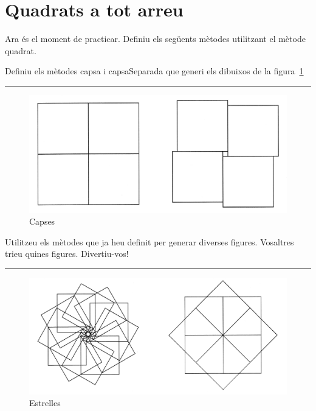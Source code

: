 \section{Quadrats a tot arreu}
Ara és el moment de practicar. Definiu els següents mètodes utilitzant el mètode \textsf{quadrat}.

\begin{center}
\colorbox{black}{}
\end{center}
{\small
\noindent
Definiu els mètodes \textsf{capsa} i \textsf{capsaSeparada} que generi els dibuixos de la figura~\ref{fig1301}}\\
\noindent
\rule{\textwidth}{3pt}

\begin{figure}[h!]
\begin{center}
\includegraphics[scale=0.1]{Imatges/figura13-1.jpg}
\end{center}
\caption{Capses}
\label{fig1301}
\end{figure}

\begin{center}
\colorbox{black}{}
\end{center}
{\small
\noindent
Utilitzeu els mètodes que ja heu definit per generar diverses figures. Vosaltres trieu quines figures. Divertiu-vos!}\\
\noindent
\rule{\textwidth}{3pt}

\begin{figure}[h!]
\begin{center}
\includegraphics[scale=0.1]{Imatges/figura13-2.jpg}
\end{center}
\caption{Estrelles}
\label{fig1302}
\end{figure}

